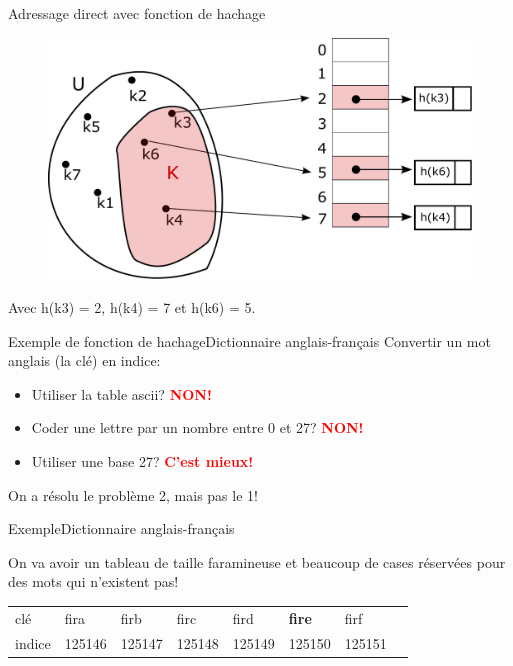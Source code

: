 \documentclass[12pt,a4paper]{beamer}
\newcommand{\hl}[1]{\textcolor{blueemph}{#1}}
\begin{document}
\begin{frame}{Adressage direct avec fonction de hachage}


\begin{figure}
\includegraphics[scale=0.30]{figs/ht_cle_unseq_k}
\end{figure}
Avec
\footnotesize  h(k3) = 2,  h(k4) = 7 et h(k6) = 5.


\end{frame}



\begin{frame}{Exemple de fonction de hachage}{Dictionnaire anglais-français}
Convertir un mot anglais (la clé) en indice:


\begin{itemize}
\item Utiliser la table ascii? \pause \textcolor{red}{\textbf{NON!}}
\pause
\item Coder une lettre par un nombre entre 0 et 27? \pause \textcolor{red}{\textbf{NON!}}
\pause
\item Utiliser une base 27? \pause \textcolor{red}{\textbf{C'est mieux!}}
\end{itemize}
\pause
On a résolu le problème 2, mais pas le 1!
\end{frame}

\begin{frame}{Exemple}{Dictionnaire anglais-français}

\begin{block}{}
On va avoir un tableau de taille faramineuse et beaucoup de cases réservées pour des mots qui n'existent pas!
\end{block}
\begin{table}
    \begin{tabular}{l|lllllll}
 \hl{clé} &   fira   & firb   & firc   & fird   & \textbf{fire}   & firf     \\
   \hl{indice} & 125146 & 125147 & 125148 & 125149 & 125150 & 125151  \\
    \end{tabular}
\end{table}

\end{frame}
\end{document}
